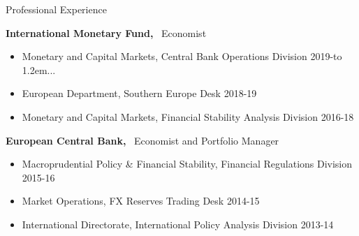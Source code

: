 \documentclass[usegeometry, 10pt, a4paper]{cv} %
\newcommand{\activite}[1]{\textbf{#1}\ }
\newcommand{\twodots}{\hbox to 1.2em{\hss.\hss.\hss.}}
\begin{document}
\begin{rubriquetableau}[0.95\textwidth]{Professional Experience}\\
\vspace{-0.3cm}

\activite{International Monetary Fund,} Economist  \\

\begin{itemize}[label={}]
  
\item Monetary and Capital Markets, Central Bank Operations Division \hfill 2019-\twodots
  
\item European Department, Southern Europe Desk \hfill 2018-19
  
\item Monetary and Capital Markets, Financial Stability Analysis Division \hfill 2016-18
\end{itemize}

\vspace{0.5cm}

\activite{European Central Bank,} Economist and Portfolio Manager \\

\begin{itemize}[label={}]  
\item Macroprudential Policy \& Financial Stability, Financial
  Regulations Division \hfill 2015-16
  
\item Market Operations, FX Reserves Trading Desk \hfill 2014-15
  
\item International Directorate, International Policy Analysis Division \hfill 2013-14
\end{itemize}
\end{rubriquetableau}
\end{document}
